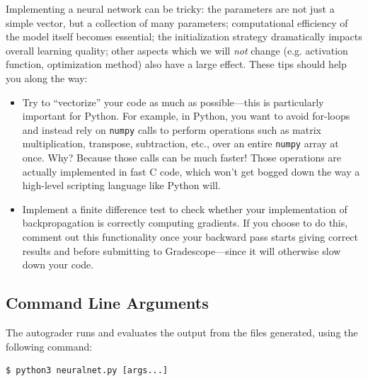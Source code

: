 \documentclass[11pt,addpoints,answers]{exam}
\begin{document}
Implementing a neural network can be tricky: the parameters are not just a simple vector, but a collection of many parameters; computational efficiency of the model itself becomes essential; the initialization strategy dramatically impacts overall learning quality;  other aspects which we will \emph{not} change (e.g. activation function, optimization method) also have a large effect. These tips should help you along the way:

\begin{itemize}
\item Try to ``vectorize'' your code as much as possible---this is particularly important for Python. For example, in Python, you want to avoid for-loops and instead rely on \lstinline{numpy} calls to perform operations such as matrix multiplication, transpose, subtraction, etc., over an entire \lstinline{numpy} array at once. Why? Because those calls can be much faster! Those operations are actually implemented in fast C code, which won't get bogged down the way a high-level scripting language like Python will.
\item Implement a finite difference test to check whether your implementation of backpropagation is correctly computing gradients. If you choose to do this, comment out this functionality once your backward pass starts giving correct results and before submitting to Gradescope---since it will otherwise slow down your code.
\end{itemize}

\subsection{Command Line Arguments}
\label{sec:args}
The autograder runs and evaluates the output from the files generated, using the following command:

\begin{lstlisting}[language=Shell]
$ python3 neuralnet.py [args...]
\end{lstlisting}
\end{document}
